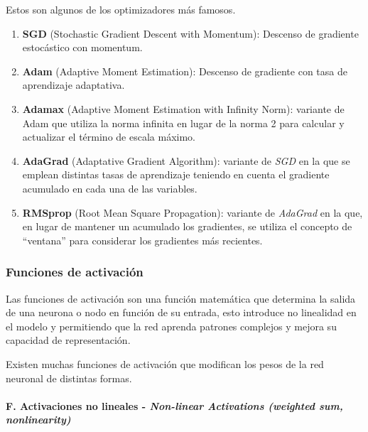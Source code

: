 Estos son algunos de los optimizadores más famosos.
\begin{enumerate}
    \item \textbf{SGD} (Stochastic Gradient Descent with Momentum): Descenso de gradiente estocástico con momentum.
    \item \textbf{Adam} (Adaptive Moment Estimation): Descenso de gradiente con tasa de aprendizaje adaptativa.
    \item \textbf{Adamax} (Adaptive Moment Estimation with Infinity Norm):  variante de Adam que utiliza la norma infinita en lugar de la norma 2 para calcular y actualizar el término de escala máximo.
    \item \textbf{AdaGrad} (Adaptative Gradient Algorithm): variante de \textit{SGD} en la que se emplean distintas tasas de aprendizaje teniendo en cuenta el gradiente acumulado en cada una de las variables.
    \item \textbf{RMSprop} (Root Mean Square Propagation): variante de \textit{AdaGrad} en la que, en lugar de mantener un acumulado los gradientes, se utiliza el concepto de ``ventana'' para considerar los gradientes más recientes.
\end{enumerate}


\subsubsection{Funciones de activación\label{sec:activations-functions}}
Las funciones de activación son una función matemática que determina la salida de una neurona o nodo en función de su entrada, esto introduce no linealidad en el modelo y permitiendo que la red aprenda patrones complejos y mejora su capacidad de representación.

Existen muchas funciones de activación que modifican los pesos de la red neuronal de distintas formas.

\paragraph*{F. Activaciones no lineales - \textit{Non-linear Activations (weighted sum, nonlinearity)} \cite{pytorch2024github}}

